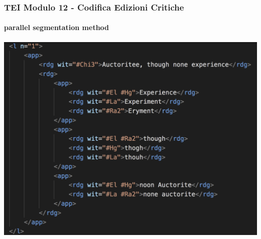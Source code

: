 \begin{frame}
    \frametitle{TEI Modulo 12 - Codifica Edizioni Critiche}
    \framesubtitle{parallel segmentation method}
    \addtocounter{nframe}{1}




   
    \begin{center}
       \includegraphics[width=.90\textwidth]{imgs/parallel-segmentation-nested.png}
    \end{center}

\end{frame}


